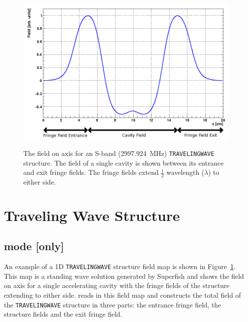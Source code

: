 \begin{figure}
  \begin{center}
  \includegraphics[origin=bl,height=80mm,angle=0]{./figures/traveling-wave-structure/FINSB-RAC-field.png}
  \caption{\label{figure_FINSB-RAC-field}
    The field on axis for an S-band (2997.924~MHz) \texttt{TRAVELINGWAVE} structure. The field of a single cavity
    is shown between its entrance and exit fringe fields. The fringe fields extend $\frac{1}{2}$ wavelength ($\lambda$) to either side.
  }
  \end{center}
%
\end{figure}

\section{Traveling Wave Structure}
\label{sec:travelingwave}
\subsection{\opalt mode [only]}
An example of a 1D \texttt{TRAVELINGWAVE} structure field map is shown in Figure~\ref{figure_FINSB-RAC-field}.
This map is a standing wave solution generated by Superfish and shows the field on axis for a single accelerating cavity with
the fringe fields of the structure extending to either side. \opalt reads in this field map and constructs the total field of the
\texttt{TRAVELINGWAVE} structure in three parts: the entrance fringe field, the structure fields and the exit fringe field. \\\\

